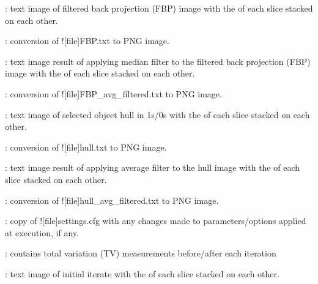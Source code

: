 \begin{tcbenvironment}
\begin{tcbparagraph}
\begin{ThinEnum}
\begin{ThinEnum}
\begin{ThinEnum}
\begin{ThinEnum}
\begin{ThinEnum}
\begin{ThinEnum}
\begin{ThinEnum}
\begin{ThinEnum}
\begin{ThinEnum}
                                        	\item {} : text image of filtered back projection (FBP) image with the \xyplane* of each slice stacked on each other.
                                        	\item {} : conversion of \docentry![file]{FBP.txt} to PNG image.
                                        	\item {} : text image result of applying median filter to the filtered back projection (FBP) image with the \xyplane* of each slice stacked on each other.
                                        	\item {} : conversion of \docentry![file]{FBP\_avg\_filtered.txt} to PNG image.
                                        	\item {} : text image of selected object hull in 1s/0s with the \xyplane* of each slice stacked on each other.
                                        	\item {} : conversion of \docentry![file]{hull.txt} to PNG image.
                                        	\item {} : text image result of applying average filter to the hull image with the \xyplane* of each slice stacked on each other.
							\item {} : conversion of \docentry![file]{hull\_avg\_filtered.txt} to PNG image.
							\item {} : copy of \docentry![file]{settings.cfg} with any changes made to parameters/options applied at execution, if any.
                                        	\item {} : contains total variation (TV) measurements before/after each iteration
                                        	\item {} : text image of initial iterate with the \xyplane* of each slice stacked on each other.
\newpage

\end{ThinEnum}
\end{ThinEnum}
\end{ThinEnum}
\end{ThinEnum}
\end{ThinEnum}
\end{ThinEnum}
\end{ThinEnum}
\end{ThinEnum}
\end{ThinEnum}
\end{tcbparagraph}
\end{tcbenvironment}
